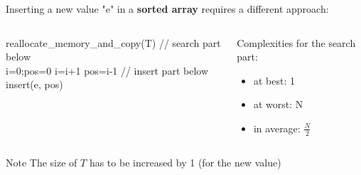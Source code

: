 \documentclass{beamer}[10pt, usepdftitle=false, handout]
\begin{document}
	\begin{frame}
	
	Inserting a new value "e" in a \textbf{sorted array} requires a different approach:
	
	\begin{columns}[c]
	\begin{center}    
    \scalebox{0.75} {
    \begin{algorithm}[H]
    reallocate\_memory\_and\_copy(T)\;
    // search part below\\
    i=0;pos=0\;
 	 {
		i=i+1\;
	}
	pos=i-1\;
	\vspace*{1em}
	// insert part below\\
	insert(e, pos)\;
	\end{algorithm}	
	}
	\end{center}	
	\begin{center}
	
	Complexities for the search part:
		
	\begin{itemize}
	\item {at best: 1}
	\item {at worst: N}
	\item {in average: $\frac{N}{2}$}	
	\end{itemize}		
	
	\end{center}
	\end{columns}		
	
	\begin{alertblock}{Note}
	The size of $T$ has to be increased by 1 (for the new value)
	\end{alertblock}		
	
	\end{frame}	
	
\end{document}
